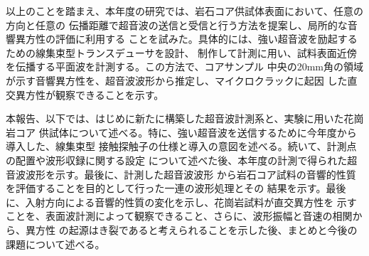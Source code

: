 以上のことを踏まえ、本年度の研究では、岩石コア供試体表面において、任意の方向と任意の
伝播距離で超音波の送信と受信と行う方法を提案し、局所的な音響異方性の評価に利用する
ことを試みた。具体的には、強い超音波を励起するための線集束型トランスデューサを設計、
制作して計測に用い、試料表面近傍を伝播する平面波を計測する。この方法で、コアサンプル
中央の20mm角の領域が示す音響異方性を、超音波波形から推定し、マイクロクラックに起因
した直交異方性が観察できることを示す。

本報告、以下では、はじめに新たに構築した超音波計測系と、実験に用いた花崗岩コア
供試体について述べる。特に、強い超音波を送信するために今年度から導入した、線集束型
接触探触子の仕様と導入の意図を述べる。続いて、計測点の配置や波形収録に関する設定
について述べた後、本年度の計測で得られた超音波波形を示す。最後に、計測した超音波波形
から岩石コア試料の音響的性質を評価することを目的として行った一連の波形処理とその
結果を示す。最後に、入射方向による音響的性質の変化を示し、花崗岩試料が直交異方性を
示すことを、表面波計測によって観察できること、さらに、波形振幅と音速の相関から、異方性
の起源はき裂であると考えられることを示した後、まとめと今後の課題について述べる。
